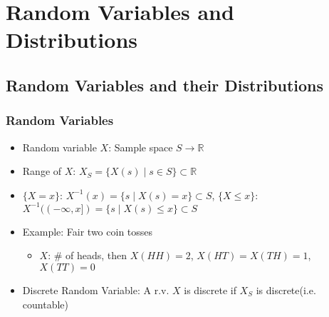 \section{Random Variables and Distributions}

\subsection{Random Variables and their Distributions}

\subsubsection*{Random Variables}
\begin{itemize}
    \item Random variable $X$: Sample space $S\to\mathbb{R}$
    \item Range of $X$: $X_S=\{X(s)\mid s\in S\}\subset\mathbb{R}$
    \item $\{X=x\}$: $X^{-1}(x)=\{s\mid X(s)=x\}\subset S$, $\{X\leq x\}$: $X^{-1}((-\infty,x])=\{s\mid X(s)\leq x\}\subset S$
    \item Example: Fair two coin tosses
    \begin{itemize}
        \item $X$: \# of heads, then $X(HH)=2$, $X(HT)=X(TH)=1$, $X(TT)=0$
    \end{itemize}
    \item Discrete Random Variable: A r.v. $X$ is discrete if $X_S$ is discrete(i.e. countable)
\end{itemize}

